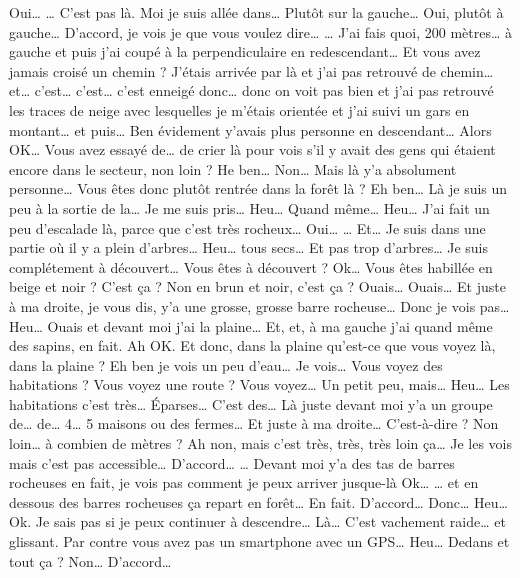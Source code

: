 \begin{dialogue}
  \Sec {} Oui…
  \Req … C'est pas là. Moi je suis allée dans… Plutôt sur la gauche…
  \Sec {} Oui, plutôt à gauche… D'accord,
  je vois je que vous voulez dire…
  \Req … J'ai fais quoi, 200 mètres… à gauche et puis j'ai coupé à la
  perpendiculaire en redescendant…
  \Sec {} Et vous avez jamais croisé un
  chemin ?
  \Req J'étais arrivée par là et j'ai pas retrouvé de chemin… et…
  c'est… c'est… c'est enneigé donc… donc on voit pas bien et j'ai pas
  retrouvé les traces de neige avec lesquelles je m'étais orientée et
  j'ai suivi un gars en montant… et puis… Ben évidement y'avais plus
  personne en descendant…
  \Sec {} Alors OK… Vous avez essayé de… de
  crier là pour vois s'il y avait des gens qui étaient encore dans le
  secteur, non loin ?
  \Rec He ben… Non… Mais là y'a absolument personne…
  \Sec {} Vous êtes donc plutôt rentrée dans
  la forêt là ?
  \Req Eh ben… Là je suis un peu à la sortie de la… Je me suis pris…
  Heu… Quand même… Heu… J'ai fait un peu d'escalade là, parce que
  c'est très rocheux…
  \Sec {} Oui…
  \Req … Et… Je suis dans une partie où il y a plein d'arbres… Heu…
  tous secs… Et pas trop d'arbres… Je suis complétement à découvert…
  \Sec {} Vous êtes à découvert ? Ok… Vous
  êtes habillée en beige et noir ? C'est ça ? Non en brun et noir,
  c'est ça ?
  \Req Ouais… Ouais… Et juste à ma droite, je vous dis, y'a une
  grosse, grosse barre rocheuse… Donc je vois pas… Heu… Ouais et
  devant moi j'ai la plaine… Et, et, à ma gauche j'ai quand même des
  sapins, en fait.
  \Sec Ah OK. Et donc, dans la plaine qu'est-ce que vous voyez là,
  dans la plaine ?
  \Req Eh ben je vois un peu d'eau… Je vois…
  \Sec {} Vous voyez des habitations ? Vous
  voyez une route ? Vous voyez…
  \Req Un petit peu, mais… Heu… Les habitations c'est très… Éparses…
  C'est des… Là juste devant moi y'a un groupe de… de… 4… 5 maisons ou
  des fermes… Et juste à ma droite…
  \Sec {} C'est-à-dire ? Non loin… à combien
  de mètres ?
  \Req Ah non, mais c'est très, très, très loin ça… Je les vois mais
  c'est pas accessible…
  \Sec {} D'accord…
  \Req … Devant moi y'a des tas de barres rocheuses en fait, je vois
  pas comment je peux arriver jusque-là
  \Sec {} Ok…
  \Req … et en dessous des barres rocheuses ça repart en forêt… En
  fait.
  \Sec D'accord… Donc… Heu… Ok.
  \Req Je sais pas si je peux continuer à descendre… Là… C'est
  vachement raide… et glissant.
  \Sec Par contre vous avez pas un smartphone avec un GPS… Heu… Dedans
  et tout ça ?
  \Req Non…
  \Sec D'accord…
\end{dialogue}